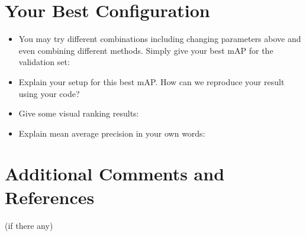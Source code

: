 \documentclass[12pt]{article}
\begin{document}
\section{Your Best Configuration}
\begin{itemize}
\item You may try different combinations including changing parameters above and even combining different methods. Simply give your best mAP for the validation set:


\item Explain your setup for this best mAP. How can we reproduce your result using your code?

\item Give some visual ranking results:

\item Explain mean average precision in your own words:
\end{itemize}

\section{Additional Comments and References}

(if there any)
\end{document}
